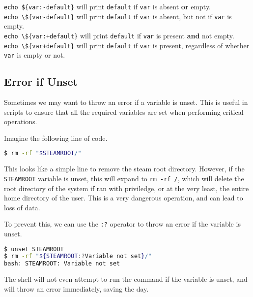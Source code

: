 \begin{remark}
  \lstinline|echo ${var:-default}| will print \lstinline{default} if \lstinline{var} is absent \textbf{or} empty. \\
  \lstinline|echo \${var-default}| will print \lstinline{default} if \lstinline{var} is absent, but not if \lstinline{var} is empty. \\
  \lstinline|echo \${var:+default}| will print \lstinline{default} if \lstinline{var} is present \textbf{and} not empty. \\
  \lstinline|echo \${var+default}| will print \lstinline{default} if \lstinline{var} is present,
  regardless of whether \lstinline{var} is empty or not. \\
\end{remark}

\subsection{Error if Unset}

Sometimes we may want to throw an error if a variable is unset. This is useful in scripts to ensure that all the required variables are set when performing critical operations.

Imagine the following line of code.

\begin{lstlisting}[language=bash]
$ rm -rf "$STEAMROOT/"
\end{lstlisting}

This looks like a simple line to remove the steam root directory. However, if the \lstinline{STEAMROOT} variable is unset, this will expand to \lstinline{rm -rf /}, which will delete the root directory of the system if ran with priviledge, or at the very least, the entire home directory of the user.
This is a very dangerous operation, and can lead to loss of data.

To prevent this, we can use the \lstinline{:?} operator to throw an error if the variable is unset.

\begin{lstlisting}[language=bash]
$ unset STEAMROOT
$ rm -rf "${STEAMROOT:?Variable not set}/"
bash: STEAMROOT: Variable not set
\end{lstlisting}

The shell will not even attempt to run the command if the variable is unset, and will throw an error immediately, saving the day.

